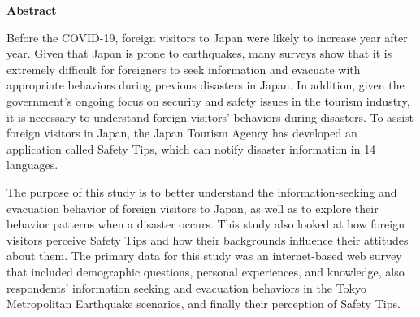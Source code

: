 
\begin{center}\textbf{Abstract}\end{center}

Before the COVID-19, foreign visitors to Japan were likely to increase year after year. Given that Japan is prone to earthquakes, many surveys show that it is extremely difficult for foreigners to seek information and evacuate with appropriate behaviors during previous disasters in Japan. In addition, given the government's ongoing focus on security and safety issues in the tourism industry, it is necessary to understand foreign visitors' behaviors during disasters. To assist foreign visitors in Japan, the Japan Tourism Agency has developed an application called Safety Tips, which can notify disaster information in 14 languages.

The purpose of this study is to better understand the information-seeking and evacuation behavior of foreign visitors to Japan, as well as to explore their behavior patterns when a disaster occurs. This study also looked at how foreign visitors perceive Safety Tips and how their backgrounds influence their attitudes about them. The primary data for this study was an internet-based web survey that included demographic questions, personal experiences, and knowledge, also respondents' information seeking and evacuation behaviors in the Tokyo Metropolitan Earthquake scenarios, and finally their perception of Safety Tips. 

